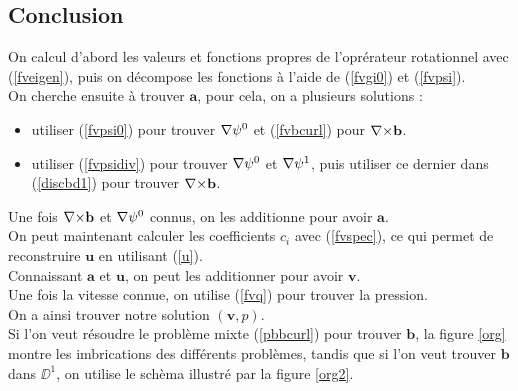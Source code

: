 \subsection{Conclusion}

On calcul d'abord les valeurs et fonctions propres de l'oprérateur rotationnel avec (\ref{fveigen}), puis on décompose les fonctions à l'aide de (\ref{fvgi0}) et (\ref{fvpsi}).\\
On cherche ensuite à trouver $\mathbf{a}$, pour cela, on a plusieurs solutions :
\begin{itemize}
\item utiliser (\ref{fvpsi0}) pour trouver ${\nabla}\psi^0$  et (\ref{fvbcurl}) pour ${\nabla\times} \mathbf{b}$.
\item utiliser (\ref{fvpsidiv}) pour trouver ${\nabla}\psi^0$ et ${\nabla}\psi^1$, puis utiliser ce dernier dans (\ref{discbd1}) pour trouver ${\nabla\times} \mathbf{b}$.
\end{itemize}
Une fois ${\nabla\times} \mathbf{b}$ et ${\nabla}\psi^0$ connus, on les additionne pour avoir $\mathbf{a}$.\\
On peut maintenant calculer les coefficients $c_i$ avec (\ref{fvspec}), ce qui permet de reconstruire $\mathbf{u}$ en utilisant (\ref{u}).\\
Connaissant $\mathbf{a}$ et $\mathbf{u}$, on peut les additionner pour avoir $\mathbf{v}$.\\
Une fois la vitesse connue, on utilise (\ref{fvq}) pour trouver la pression.\\

On a ainsi trouver notre solution $(\mathbf{v},p)$.\\
Si l'on veut résoudre le problème mixte (\ref{pbbcurl}) pour trouver $\mathbf{b}$, la figure \ref{org} montre les imbrications des différents problèmes, tandis que si l'on veut trouver $\mathbf{b}$ dans $\DD^1$, on utilise le schèma illustré par la figure \ref{org2}.\\

